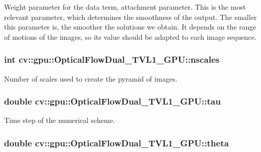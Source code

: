 Weight parameter for the data term, attachment parameter. This is the most relevant parameter, which determines the smoothness of the output. The smaller this parameter is, the smoother the solutions we obtain. It depends on the range of motions of the images, so its value should be adapted to each image sequence. \hypertarget{classcv_1_1gpu_1_1OpticalFlowDual__TVL1__GPU_ac17a62999ac19bed123d8f6bb4f5336d}{
\subsubsection[{nscales}]{\setlength{\rightskip}{0pt plus 5cm}int cv\-::gpu\-::\-Optical\-Flow\-Dual\-\_\-\-T\-V\-L1\-\_\-\-G\-P\-U\-::nscales}}\label{classcv_1_1gpu_1_1OpticalFlowDual__TVL1__GPU_ac17a62999ac19bed123d8f6bb4f5336d}
Number of scales used to create the pyramid of images. \hypertarget{classcv_1_1gpu_1_1OpticalFlowDual__TVL1__GPU_a4c50ab56c6ffda2331479b5bafd5c267}{
\subsubsection[{tau}]{\setlength{\rightskip}{0pt plus 5cm}double cv\-::gpu\-::\-Optical\-Flow\-Dual\-\_\-\-T\-V\-L1\-\_\-\-G\-P\-U\-::tau}}\label{classcv_1_1gpu_1_1OpticalFlowDual__TVL1__GPU_a4c50ab56c6ffda2331479b5bafd5c267}
Time step of the numerical scheme. \hypertarget{classcv_1_1gpu_1_1OpticalFlowDual__TVL1__GPU_ad9b6b7b90dbe73bb780c51f2a0d90ecc}{
\subsubsection[{theta}]{\setlength{\rightskip}{0pt plus 5cm}double cv\-::gpu\-::\-Optical\-Flow\-Dual\-\_\-\-T\-V\-L1\-\_\-\-G\-P\-U\-::theta}}\label{classcv_1_1gpu_1_1OpticalFlowDual__TVL1__GPU_ad9b6b7b90dbe73bb780c51f2a0d90ecc}
